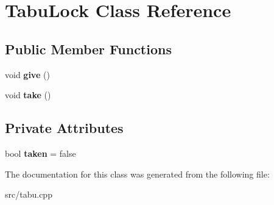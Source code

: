 \hypertarget{classTabuLock}{}\section{Tabu\+Lock Class Reference}
\label{classTabuLock}
\subsection*{Public Member Functions}
\begin{DoxyCompactItemize}
\item 
\mbox{\label{classTabuLock_abe8c5cb1f343a72d0cdac3ee6f917c22}} 
void {\bfseries give} ()
\item 
\mbox{\label{classTabuLock_a6f6308ba394ad0067611d6b8b154a323}} 
void {\bfseries take} ()
\end{DoxyCompactItemize}
\subsection*{Private Attributes}
\begin{DoxyCompactItemize}
\item 
\mbox{\label{classTabuLock_a6977b5fa71b91ac9aa65be746c607ed4}} 
bool {\bfseries taken} = false
\end{DoxyCompactItemize}


The documentation for this class was generated from the following file\+:\begin{DoxyCompactItemize}
\item 
src/tabu.\+cpp\end{DoxyCompactItemize}
